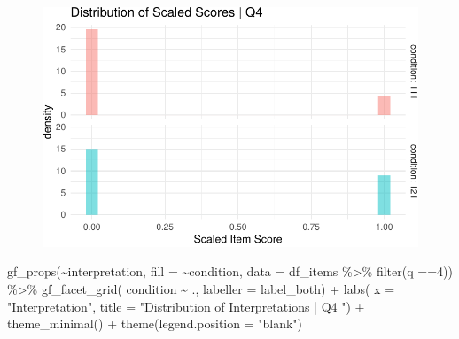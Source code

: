 \documentclass[
  letterpaper,
  DIV=11,
  numbers=noendperiod]{scrreprt}
\newenvironment{Shaded}{\begin{snugshade}}{\end{snugshade}}
\newcommand{\AttributeTok}[1]{\textcolor[rgb]{0.40,0.45,0.13}{#1}}
\newcommand{\DecValTok}[1]{\textcolor[rgb]{0.68,0.00,0.00}{#1}}
\newcommand{\FunctionTok}[1]{\textcolor[rgb]{0.28,0.35,0.67}{#1}}
\newcommand{\NormalTok}[1]{\textcolor[rgb]{0.00,0.23,0.31}{#1}}
\newcommand{\SpecialCharTok}[1]{\textcolor[rgb]{0.37,0.37,0.37}{#1}}
\newcommand{\StringTok}[1]{\textcolor[rgb]{0.13,0.47,0.30}{#1}}
\begin{document}
\begin{figure}[H]

{\centering \includegraphics{analysis/SGC3A/2_sgc3A_scoring_files/figure-pdf/Q4-distribution-1.pdf}

}

\end{figure}

\begin{Shaded}
\begin{Highlighting}[]
\FunctionTok{gf\_props}\NormalTok{(}\SpecialCharTok{\textasciitilde{}}\NormalTok{interpretation, }\AttributeTok{fill =} \SpecialCharTok{\textasciitilde{}}\NormalTok{condition, }\AttributeTok{data =}\NormalTok{ df\_items }\SpecialCharTok{\%\textgreater{}\%} \FunctionTok{filter}\NormalTok{(q }\SpecialCharTok{==}\DecValTok{4}\NormalTok{)) }\SpecialCharTok{\%\textgreater{}\%} 
  \FunctionTok{gf\_facet\_grid}\NormalTok{( condition }\SpecialCharTok{\textasciitilde{}}\NormalTok{ ., }\AttributeTok{labeller =}\NormalTok{ label\_both) }\SpecialCharTok{+} 
  \FunctionTok{labs}\NormalTok{( }\AttributeTok{x =} \StringTok{"Interpretation"}\NormalTok{, }\AttributeTok{title =} \StringTok{"Distribution of Interpretations | Q4 "}\NormalTok{) }\SpecialCharTok{+} 
  \FunctionTok{theme\_minimal}\NormalTok{() }\SpecialCharTok{+} \FunctionTok{theme}\NormalTok{(}\AttributeTok{legend.position =} \StringTok{"blank"}\NormalTok{)}
\end{Highlighting}
\end{Shaded}
\end{document}
